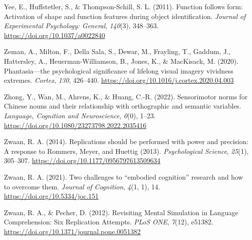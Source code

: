 \documentclass[
  12pt,
  man,floatsintext]{apa7}
\newlength{\cslhangindent}
\newlength{\cslentryspacingunit} %
\newenvironment{CSLReferences}[2] %
 {%
  \setlength{\parindent}{0pt}
  \ifodd #1
  \let\oldpar\par
  \def\par{\hangindent=\cslhangindent\oldpar}
  \fi
  \setlength{\parskip}{#2\cslentryspacingunit}
 }%
 {}
\begin{document}
\begin{CSLReferences}{1}{0}
\leavevmode{}%
Yee, E., Huffstetler, S., \& Thompson-Schill, S. L. (2011). Function follows form: {Activation} of shape and function features during object identification. \emph{Journal of Experimental Psychology: General}, \emph{140}(3), 348--363. \url{https://doi.org/10.1037/a0022840}

\leavevmode{}%
Zeman, A., Milton, F., Della Sala, S., Dewar, M., Frayling, T., Gaddum, J., Hattersley, A., Heuerman-Williamson, B., Jones, K., \& MacKisack, M. (2020). Phantasia---the psychological significance of lifelong visual imagery vividness extremes. \emph{Cortex}, \emph{130}, 426--440. \url{https://doi.org/10.1016/j.cortex.2020.04.003}

\leavevmode{}%
Zhong, Y., Wan, M., Ahrens, K., \& Huang, C.-R. (2022). Sensorimotor norms for {Chinese} nouns and their relationship with orthographic and semantic variables. \emph{Language, Cognition and Neuroscience}, \emph{0}(0), 1--23. \url{https://doi.org/10.1080/23273798.2022.2035416}

\leavevmode{}%
Zwaan, R. A. (2014). Replications should be performed with power and precision: {A} response to {Rommers}, {Meyer}, and {Huettig} (2013). \emph{Psychological Science}, \emph{25}(1), 305--307. \url{https://doi.org/10.1177/0956797613509634}

\leavevmode{}%
Zwaan, R. A. (2021). Two challenges to {``embodied cognition''} research and how to overcome them. \emph{Journal of Cognition}, \emph{4}(1, 1), 14. \url{https://doi.org/10.5334/joc.151}

\leavevmode{}%
Zwaan, R. A., \& Pecher, D. (2012). Revisiting {Mental Simulation} in {Language Comprehension}: {Six Replication Attempts}. \emph{PLoS ONE}, \emph{7}(12), e51382. \url{https://doi.org/10.1371/journal.pone.0051382}

\end{CSLReferences}
\end{document}
